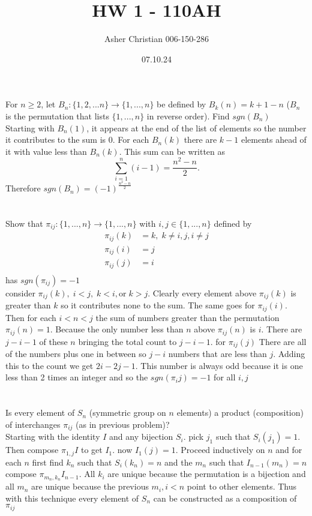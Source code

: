\documentclass{article}
\title{HW 1 - 110AH}
\author{Asher Christian 006-150-286}
\date{07.10.24}
\begin{document}
    \maketitle
    \section{}
    For $n \ge 2$, let $B_n : \{1,2,...n\} \rightarrow \{1,...,n\}$
    be defined by  $B_k(n) = k+1-n$ 
    ($B_n$ is the permutation that lists $\{1,...,n\}$ in reverse order).
    Find $sgn(B_n)$\\
    Starting with $B_n(1)$, it appears at the end of the list of elements so the number it contributes to the sum is $0$.
    For each $B_n(k)$ there are $k-1$ elements ahead of it with value less than $B_n(k)$.
    This sum can be written as
     \[
    \sum_{i=1}^{n}(i-1) = \frac{n^2-n}{2}
    .\] 
    Therefore $sgn(B_n) = (-1)^{\frac{n^2-n}{2}}$
    \section{}
    Show that $\pi_{ij} : \{1,...,n\} \rightarrow \{1,...,n\}$ with $i,j \in \{1,...,n\}$ defined by
    \begin{align*}
        \pi_{ij}(k) &= k, \; k \ne i,j, i\ne j\\
        \pi_{ij}(i) &= j\\
        \pi_{ij}(j) &= i\\
    \end{align*}
    has $sgn(\pi_{ij}) = -1$\\
    consider $\pi_{ij}(k), \; i < j, \; k < i, \text{or} \; k > j$. Clearly every element above $\pi_{ij}(k)$ is greater than $k$ so it contributes none to the sum.
    The same goes for $\pi_{ij}(i)$. Then for each $i < n < j$  the sum of numbers greater than the permutation $\pi_{ij}(n) = 1$. Because the only number less than $n$ above $\pi_{ij}(n)$ is $i$.
    There are $j-i-1$ of these $n$ bringing the total count to $j-i-1$.
    for $\pi_{ij}(j)$ There are all of the numbers plus one in between so $j-i$ numbers that are less than $j$. Adding this to the count we get $2i-2j-1$.
    This number is always odd because it is one less than 2 times an integer and so the $sgn(\pi_ij) = -1$ for all $i,j$

    \section{}
    Is every element of $S_n$ (symmetric group on $n$ elements) a product (composition) of 
    interchanges $\pi_{ij}$ (as in previous problem)?
    \\
    Starting with the identity $I$ and any bijection $S_i$. pick $j_1$ such that
    $S_i(j_1) = 1$. Then compose $\pi_{1,j}I$ to get $I_1$. now $I_1(j) =  1$. Proceed inductively on  $n$ and for each $n$ first find $k_n$ such that $S_i(k_n) = n$ and the $m_n$ such that $I_{n-1}(m_n) = n$ compose $\pi_{m_n,k_n}I_{n-1}$. 
    All $k_i$ are unique because the permutation is a bijection and all $m_n$ are unique because the previous $m_i, i < n$ point to other elements.
    Thus with this technique every element of $S_n$ can be constructed as a composition of $\pi_{ij}$
    
\end{document}
